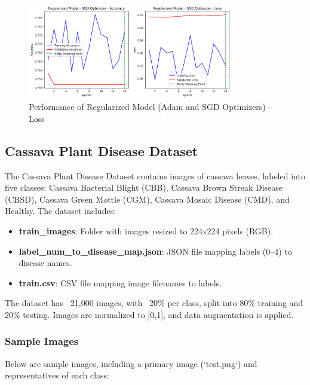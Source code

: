 \documentclass[a4paper,12pt]{article}
\begin{document}
\begin{figure}[H]
    \centering
    \includegraphics[width=0.8\textwidth]{assets/diabetes/sgd_diabetes_loss.png}
    \caption{Performance of Regularized Model (Adam and SGD Optimizers) - Loss}
\end{figure}



\subsection*{Cassava Plant Disease Dataset}
The Cassava Plant Disease Dataset contains images of cassava leaves, labeled into five classes: Cassava Bacterial Blight (CBB), Cassava Brown Streak Disease (CBSD), Cassava Green Mottle (CGM), Cassava Mosaic Disease (CMD), and Healthy. The dataset includes:
\begin{itemize}
    \item \textbf{train\_images}: Folder with images resized to 224x224 pixels (RGB).
    \item \textbf{label\_num\_to\_disease\_map.json}: JSON file mapping labels (0–4) to disease names.
    \item \textbf{train.csv}: CSV file mapping image filenames to labels.
\end{itemize}
The dataset has ~21,000 images, with ~20\% per class, split into 80\% training and 20\% testing. Images are normalized to [0,1], and data augmentation is applied.

\subsubsection*{Sample Images}
Below are sample images, including a primary image (`test.png`) and representatives of each class:
\end{document}
